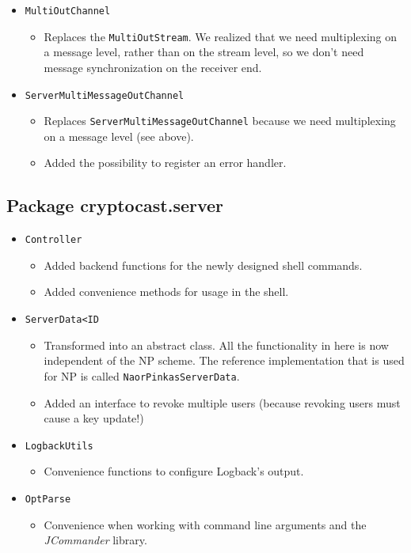 \documentclass[a4paper,10pt]{scrartcl}
\begin{document}
\begin{itemize}
	\item \lstinline|MultiOutChannel|
  \begin{itemize}
	 \item Replaces the \lstinline|MultiOutStream|. We realized that we need multiplexing on a
	       message level, rather than on the stream level, so we don't need message synchronization
				 on the receiver end.
  \end{itemize}

  \item \lstinline|ServerMultiMessageOutChannel|
  \begin{itemize}
	 \item Replaces \lstinline|ServerMultiMessageOutChannel| because we need multiplexing
	 on a message level (see above).
	 \item Added the possibility to register an error handler.
  \end{itemize}
\end{itemize}

\subsection{Package cryptocast.server}

\begin{itemize}

\item \lstinline|Controller|
\begin{itemize}
 \item Added backend functions for the newly designed shell commands.
 \item Added convenience methods for usage in the shell.
\end{itemize}

\item \lstinline|ServerData<ID|
\begin{itemize}
	\item Transformed into an abstract class. All the functionality in here is now
	      independent of the NP scheme. The reference implementation that is used for
				NP is called \lstinline|NaorPinkasServerData|.
	\item Added an interface to revoke multiple users (because revoking users must cause a
	      key update!)
\end{itemize}

\item \lstinline|LogbackUtils|
  \begin{itemize}
   \item Convenience functions to configure Logback's output.
  \end{itemize}

\item \lstinline|OptParse|
\begin{itemize}
	\item Convenience when working with command line arguments and the \emph{JCommander} library.
\end{itemize}

\end{itemize}
\end{document}
